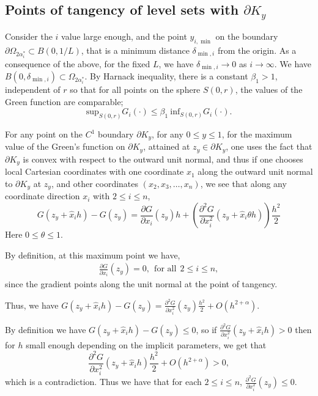 \documentclass{article}
\theoremstyle{plain}
\theoremstyle{definition}
\theoremstyle{plain}
\begin{document}
\subsection{Points of tangency of level sets with $\partial K_y$}
Consider the $i$ value large enough, and the point $y_{i, \min}$ on the boundary $\partial \Omega_{2\alpha_i^*}\subset B(0,1/L)$, that is a minimum distance $\delta_{\min, i}$ from the origin. As a consequence of the above, for the fixed $L$, we have $\delta_{\min, i} \to 0$ as $i \to \infty$. We have $B(0, \delta_{\min, i}) \subset \Omega_{2\alpha_i^*}$. By Harnack inequality, there is a constant $\beta_1 >1$, independent of $r$ so that for all points on the sphere $S(0,r)$, the values of the Green function are comparable;
\begin{equation}
    \text{sup}_{S(0,r)}G_i(\cdot)\leq \beta_1 \ \text{inf}_{S(0,r)}G_i(\cdot).
\end{equation}

For any point on the $C^1$ boundary $\partial K_y$, for any $0 \le y \le 1$, for the maximum value of the Green's function on $\partial K_y$, attained at $z_y \in \partial K_y$, one uses the fact that $\partial K_y$ is convex with respect to the outward unit normal, and thus if one chooses local Cartesian coordinates with one coordinate $x_1$ along the outward unit normal to $\partial K_y$ at $z_y$, and other coordinates $(x_2, x_3, \dots, x_n)$, we see that along any coordinate direction $x_i$ with $2 \le i \le n$,
\[
G(z_y + \hat{x}_i h) - G(z_y) = \frac{\partial G}{\partial x_i}(z_y)h + \left( \frac{\partial^2 G}{\partial x_i^2}(z_y + \hat{x}_i \theta h) \right) \frac{h^2}{2}
\]
Here $0 \le \theta \le 1$.

By definition, at this maximum point we have,
\begin{align}\frac{\partial G}{\partial x_i}(z_y) = 0, \ \ \text{for all} \ \ 2 \le i \le n,
\end{align}
 since the gradient points along the unit normal at the point of tangency.

Thus, we have $G(z_y + \hat{x}_i h) - G(z_y) = \frac{\partial^2 G}{\partial x_i^2}(z_y) \frac{h^2}{2} + O(h^{2+\alpha})$.

By definition we have $G(z_y + \hat{x}_i h) - G(z_y) \le 0$, so if $\frac{\partial^2 G}{\partial x_i^2}(z_y + \hat{x}_i h) > 0$ then for $h$ small enough depending on the implicit parameters, we get that $$\frac{\partial^2 G}{\partial x_i^2}(z_y + \hat{x}_i h) \frac{h^2}{2} + O(h^{2+\alpha}) > 0,$$ which is a contradiction. Thus we have that for each $2 \le i \le n$, $\frac{\partial^2 G}{\partial x_i^2}(z_y) \le 0$.
\end{document}
